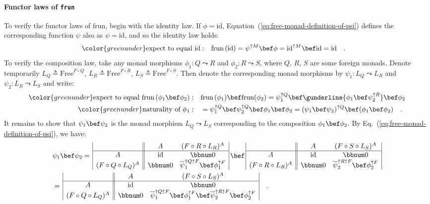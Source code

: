 \paragraph{Functor laws of \texttt{frun}}

To verify the functor laws of $\text{frun}$, begin with the identity
law. If $\phi=\text{id}$, Equation~(\ref{eq:free-monad-definition-of-psi})
defines the corresponding function $\psi$ also as $\psi=\text{id}$,
and so the identity law holds:
\begin{align*}
{\color{greenunder}\text{expect to equal }\text{id}:}\quad & \text{frun}\,(\text{id})=\psi^{\uparrow M}\bef\phi=\text{id}^{\uparrow M}\bef\text{id}=\text{id}\quad.
\end{align*}
To verify the composition law, take any monad morphisms $\phi_{1}:Q\leadsto R$
and $\phi_{2}:R\leadsto S$, where $Q$, $R$, $S$ are some foreign
monads. Denote temporarily $L_{Q}\triangleq\text{Free}^{F\circ Q}$,
$L_{R}\triangleq\text{Free}^{F\circ R}$, $L_{S}\triangleq\text{Free}^{F\circ S}$.
Then denote the corresponding monad morphisms by $\psi_{1}:L_{Q}\leadsto L_{R}$
and $\psi_{2}:L_{R}\leadsto L_{S}$ and write:
\begin{align*}
{\color{greenunder}\text{expect to equal }\text{frun}\,(\phi_{1}\bef\phi_{2}):}\quad & \text{frun}\,(\phi_{1})\bef\text{frun}(\phi_{2})=\psi_{1}^{\uparrow Q}\bef\gunderline{\phi_{1}\bef\psi_{2}^{\uparrow R}}\bef\phi_{2}\\
{\color{greenunder}\text{naturality of }\phi_{1}:}\quad & =\psi_{1}^{\uparrow Q}\bef\psi_{2}^{\uparrow Q}\bef\phi_{1}\bef\phi_{2}=(\psi_{1}\bef\psi_{2})^{\uparrow Q}\bef(\phi_{1}\bef\phi_{2})\quad.
\end{align*}
It remains to show that $\psi_{1}\bef\psi_{2}$ is the monad morphism
$L_{Q}\leadsto L_{S}$ corresponding to the composition $\phi_{1}\bef\phi_{2}$.
By Eq.~(\ref{eq:free-monad-definition-of-psi}), we have:
\begin{align*}
 & \psi_{1}\bef\psi_{2}=\,\begin{array}{|c||cc|}
 & A & (F\circ R\circ L_{R})^{A}\\
\hline A & \text{id} & \bbnum 0\\
(F\circ Q\circ L_{Q})^{A} & \bbnum 0 & \overline{\psi}_{1}^{\uparrow Q\uparrow F}\bef\phi_{1}^{\uparrow F}
\end{array}\,\bef\,\begin{array}{|c||cc|}
 & A & (F\circ S\circ L_{S})^{A}\\
\hline A & \text{id} & \bbnum 0\\
(F\circ R\circ L_{R})^{A} & \bbnum 0 & \overline{\psi}_{2}^{\uparrow R\uparrow F}\bef\phi_{2}^{\uparrow F}
\end{array}\\
 & =\,\begin{array}{|c||cc|}
 & A & (F\circ S\circ L_{S})^{A}\\
\hline A & \text{id} & \bbnum 0\\
(F\circ Q\circ L_{Q})^{A} & \bbnum 0 & \overline{\psi}_{1}^{\uparrow Q\uparrow F}\bef\phi_{1}^{\uparrow F}\bef\overline{\psi}_{2}^{\uparrow R\uparrow F}\bef\phi_{2}^{\uparrow F}
\end{array}\quad.
\end{align*}
